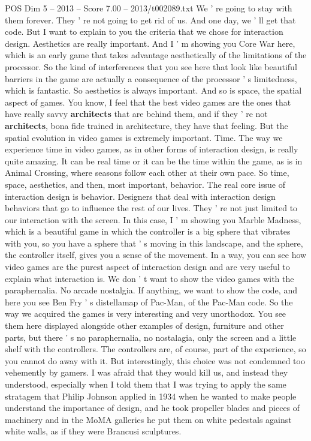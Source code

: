 \begin{textsample}{POS Dim 5 – 2013 – Score 7.00 – 2013/t002089.txt}
We ' re going to stay with them forever.
They ' re not going to get rid of us.
And one day, we ' ll get that code.
But I want to explain to you the criteria that we chose for interaction design.
Aesthetics are really important.
And I ' m showing you Core War here, which is an early game that takes advantage aesthetically of the limitations of the processor.
So the kind of interferences that you see here that look like beautiful barriers in the game are actually a consequence of the processor ' s limitedness, which is fantastic.
So aesthetics is always important.
And so is space, the spatial aspect of games.
You know, I feel that the best video games are the ones that have really savvy \textbf{architects} that are behind them, and if they ' re not \textbf{architects}, bona fide trained in architecture, they have that feeling.
But the spatial evolution in video games is extremely important.
Time.
The way we experience time in video games, as in other forms of interaction design, is really quite amazing.
It can be real time or it can be the time within the game, as is in Animal Crossing, where seasons follow each other at their own pace.
So time, space, aesthetics, and then, most important, behavior.
The real core issue of interaction design is behavior.
Designers that deal with interaction design behaviors that go to influence the rest of our lives.
They ' re not just limited to our interaction with the screen.
In this case, I ' m showing you Marble Madness, which is a beautiful game in which the controller is a big sphere that vibrates with you, so you have a sphere that ' s moving in this landscape, and the sphere, the controller itself, gives you a sense of the movement.
In a way, you can see how video games are the purest aspect of interaction design and are very useful to explain what interaction is.
We don ' t want to show the video games with the paraphernalia.
No arcade nostalgia.
If anything, we want to show the code, and here you see Ben Fry ' s distellamap of Pac-Man, of the Pac-Man code.
So the way we acquired the games is very interesting and very unorthodox.
You see them here displayed alongside other examples of design, furniture and other parts, but there ' s no paraphernalia, no nostalagia, only the screen and a little shelf with the controllers.
The controllers are, of course, part of the experience, so you cannot do away with it.
But interestingly, this choice was not condemned too vehemently by gamers.
I was afraid that they would kill us, and instead they understood, especially when I told them that I was trying to apply the same stratagem that Philip Johnson applied in 1934 when he wanted to make people understand the importance of design, and he took propeller blades and pieces of machinery and in the MoMA galleries he put them on white pedestals against white walls, as if they were Brancusi sculptures.

\end{textsample}
